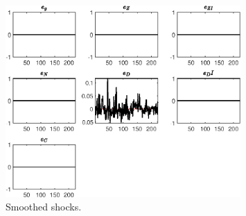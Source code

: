  
\begin{figure}[H]
\centering 
\includegraphics[width=0.80\textwidth]{BRS_growth_KPR_D/graphs/BRS_growth_KPR_D_SmoothedShocks1}
\caption{Smoothed shocks.}\label{Fig:SmoothedShocks:1}
\end{figure}


